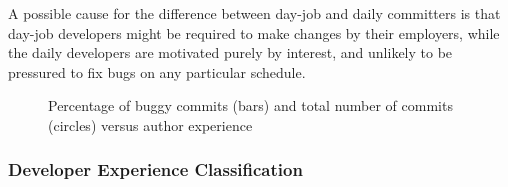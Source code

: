 A possible cause for the difference between day-job and daily committers is that
day-job developers might be required to make changes by their employers, while
the daily developers are motivated purely by interest, and unlikely to be
pressured to fix bugs on any particular schedule.

\begin{figure}[tbh]
\centering
{}
\caption{\label{fig-bugginess-experience}Percentage of buggy commits (bars) and
  total number of commits (circles) versus author experience}
\end{figure}

\subsubsection{Developer Experience Classification}
\label{sec-dev-exp}

